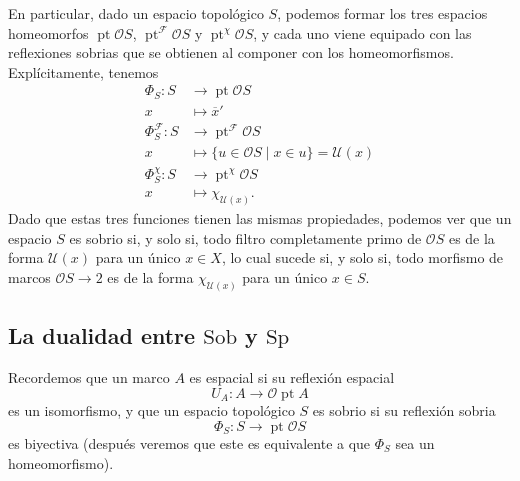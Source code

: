 \documentclass[12pt,letterpaper,titlepage]{article}
\theoremstyle{definition}
\newcommand\ol[1]{\overline{#1}}
\renewcommand\cal[1]{\mathcal{#1}}
\newcommand\tps[2]{\texorpdfstring{#1}{#2}}
\newcommand\<{\langle}
\renewcommand\>{\rangle}
\newcommand{\Sp}{\mathrm{Sp}}
\newcommand{\Sob}{\mathrm{Sob}}
\DeclareMathOperator{\pt}{pt}
\begin{document}
En particular, dado un espacio topológico $S$, podemos formar
los tres espacios homeomorfos
$\pt\cal OS$, $\pt^{\cal F}\cal OS$ y $\pt^\chi \cal OS$,
y cada uno viene equipado con las reflexiones sobrias
que se obtienen al componer con los homeomorfismos.
Explícitamente, tenemos
\begin{align*}
    \Phi_S:S&\to \pt\cal OS \\
    x&\mapsto \ol{x}' \\
    \Phi^{\cal F}_S:S&\to\pt^{\cal F}\cal OS \\
    x&\mapsto \{u\in\cal OS \mid x\in u\} = \cal U(x) \\
    \Phi^\chi_S:S&\to\pt^\chi\cal OS \\
    x&\mapsto \chi_{\cal U(x)}.
\end{align*}
Dado que estas tres funciones tienen las mismas
propiedades, podemos ver que un espacio $S$ es sobrio si,
y solo si, todo filtro completamente primo de $\cal OS$
es de la forma $\cal U(x)$ para un único $x\in X$,
lo cual sucede si, y solo si, todo morfismo de marcos
$\cal OS\to 2$ es de la forma $\chi_{\cal U(x)}$ para un único
$x\in S$.


\subsection{La dualidad entre \tps{$\Sob$}{Sob} y \tps{$\Sp$}{Sp}}

Recordemos que un marco $A$ es espacial si su reflexión espacial
\[
    U_A:A\to\cal O\pt A
\]
es un isomorfismo, y que un espacio topológico $S$ es sobrio
si su reflexión sobria
\[
    \Phi_S:S\to\pt\cal OS
\]
es biyectiva (después veremos que este es equivalente a que
$\Phi_S$ sea un homeomorfismo).
\end{document}
